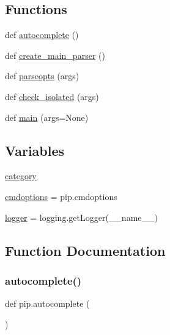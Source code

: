 \subsection*{Functions}
\begin{DoxyCompactItemize}
\item 
def \hyperlink{namespacepip_ad984b0ae74ab65120657126be3c08007}{autocomplete} ()
\item 
def \hyperlink{namespacepip_abf30ff63e79801a96948f0af0e43ee81}{create\+\_\+main\+\_\+parser} ()
\item 
def \hyperlink{namespacepip_a375e25522dc069b7d02f756f4034e30f}{parseopts} (args)
\item 
def \hyperlink{namespacepip_a76565cf9ec2dc79a313203cf5d6ad168}{check\+\_\+isolated} (args)
\item 
def \hyperlink{namespacepip_a1340561c3142d80bbe6ac01d74fa79e2}{main} (args=None)
\end{DoxyCompactItemize}
\subsection*{Variables}
\begin{DoxyCompactItemize}
\item 
\hyperlink{namespacepip_a24769fde21b80a15cd9324326010d7f4}{category}
\item 
\hyperlink{namespacepip_a95057821f4c9c87cd8cb9288b2e67019}{cmdoptions} = pip.\+cmdoptions
\item 
\hyperlink{namespacepip_ab0343c04452146bb374715148076ed68}{logger} = logging.\+get\+Logger(\+\_\+\+\_\+name\+\_\+\+\_\+)
\end{DoxyCompactItemize}


\subsection{Function Documentation}
\mbox{\label{namespacepip_ad984b0ae74ab65120657126be3c08007}} 
\subsubsection{\texorpdfstring{autocomplete()}{autocomplete()}}
{\footnotesize\ttfamily def pip.\+autocomplete (\begin{DoxyParamCaption}{ }\end{DoxyParamCaption})}

